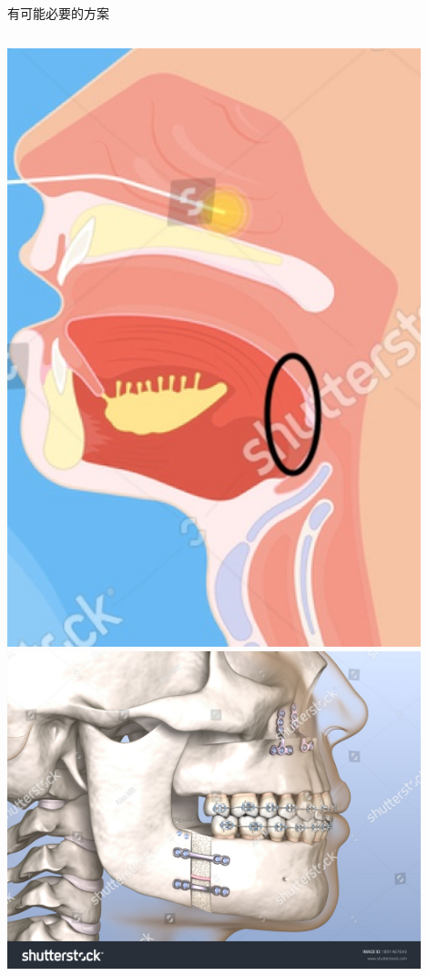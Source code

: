 \documentclass[aspectratio=169]{beamer}
\begin{document}
\begin{frame}{有可能必要的方案}
\begin{columns}
    \includegraphics[width=0.9\textwidth]{tongue_base.jpg}
    \includegraphics[width=0.9\textwidth]{stock-photo-maxillomandibular-advancement-surgery-medically-accurate-dental-d-illustration-1891467643.jpg}
    \end{columns}
\end{frame}
\end{document}

